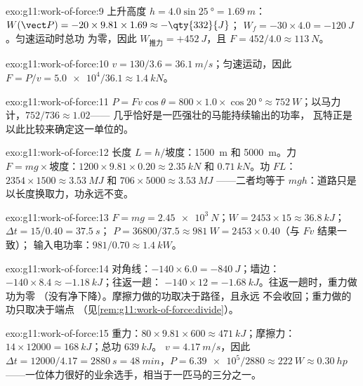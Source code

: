 \begin{solution}{exo:g11:work-of-force:9}
上升高度 $h = 4.0\sin\qty{25}{\degree} = \qty{1.69}{m}$：
$W(\vect P) = -20 \times 9.81 \times 1.69 \approx -\qty{332}{J}$；
$W_f = -30 \times 4.0 = -\qty{120}{J}$。匀速运动时总功
为零，因此 $W_{\text{推力}} = +\qty{452}{J}$，且
$F = 452/4.0 \approx \qty{113}{N}$。
\end{solution}

\begin{solution}{exo:g11:work-of-force:10}
$v = 130/3.6 = \qty{36.1}{m/s}$；匀速运动，因此
$F = P/v = \num{5.0e4}/36.1 \approx \qty{1.4}{kN}$。
\end{solution}

\begin{solution}{exo:g11:work-of-force:11}
$P = Fv\cos\theta = 800 \times 1.0 \times \cos\qty{20}{\degree}
\approx \qty{752}{W}$；以马力计，$752/736 \approx \num{1.02}$——
几乎恰好是一匹强壮的马能持续输出的功率，
瓦特正是以此比较来确定这一单位的。
\end{solution}

\begin{solution}{exo:g11:work-of-force:12}
长度 $L = h/\text{坡度}$：\qty{1500}{m} 和 \qty{5000}{m}。力
$F = mg \times \text{坡度}$：$1200 \times 9.81 \times 0.20 \approx
\qty{2.35}{kN}$ 和 $\qty{0.71}{kN}$。功 $FL$：$2354 \times 1500
\approx \qty{3.53}{MJ}$ 和 $706 \times 5000 \approx \qty{3.53}{MJ}$
——二者均等于 $mgh$：道路只是以长度换取力，功永远不变。
\end{solution}

\begin{solution}{exo:g11:work-of-force:13}
$F = mg = \qty{2.45e3}{N}$；$W = 2453 \times 15 \approx \qty{36.8}{kJ}$；
$\Delta t = 15/0.40 = \qty{37.5}{s}$；
$P = 36800/37.5 \approx \qty{981}{W} = 2453 \times 0.40$（与 $Fv$ 结果一致）；
输入电功率：$981/0.70 \approx \qty{1.4}{kW}$。
\end{solution}

\begin{solution}{exo:g11:work-of-force:14}
对角线：$-140 \times 6.0 = -\qty{840}{J}$；墙边：
$-140 \times 8.4 \approx -\qty{1.18}{kJ}$；往返一趟：
$-140 \times 12 = -\qty{1.68}{kJ}$。往返一趟时，重力做功为零
（没有净下降）。摩擦力做的功取决于路径，且永远
不会收回；重力做的功只取决于端点
（见\cref{rem:g11:work-of-force:divide}）。
\end{solution}

\begin{solution}{exo:g11:work-of-force:15}
重力：$80 \times 9.81 \times 600 \approx \qty{471}{kJ}$；摩擦力：
$14 \times 12000 = \qty{168}{kJ}$；总功 $\qty{639}{kJ}$。
$v = \qty{4.17}{m/s}$，因此 $\Delta t = 12000/4.17 = \qty{2880}{s} =
\qty{48}{min}$，$P = \num{6.39e5}/2880 \approx \qty{222}{W} \approx
\qty{0.30}{hp}$——一位体力很好的业余选手，相当于一匹马的三分之一。
\end{solution}

